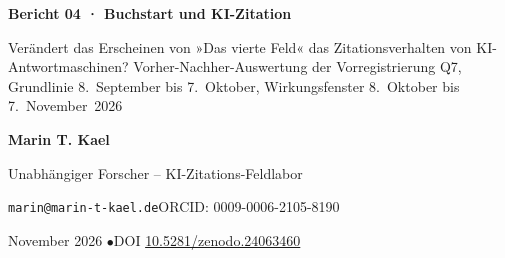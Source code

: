 \documentclass[11pt]{article}
\begin{document}
\begin{center}
{\LARGE\bfseries Bericht 04 · Buchstart und KI-Zitation\par}
\vspace{4pt}
{\large Verändert das Erscheinen von »Das vierte Feld« das Zitationsverhalten von KI-Antwortmaschinen? Vorher-Nachher-Auswertung der Vorregistrierung Q7, Grundlinie 8.~September bis 7.~Oktober, Wirkungsfenster 8.~Oktober bis 7.~November~2026\par}
\vspace{14pt}
{\large\bfseries Marin T. Kael\par}
\vspace{2pt}
Unabhängiger Forscher -- KI-Zitations-Feldlabor\par
\texttt{marin@marin-t-kael.de}\quad ORCID: 0009-0006-2105-8190\par
\vspace{12pt}
{\large November 2026 \quad$\bullet$\quad DOI \href{https://doi.org/10.5281/zenodo.24063460}{10.5281/zenodo.24063460}\par}
\end{center}
\vspace{6pt}
\end{document}
